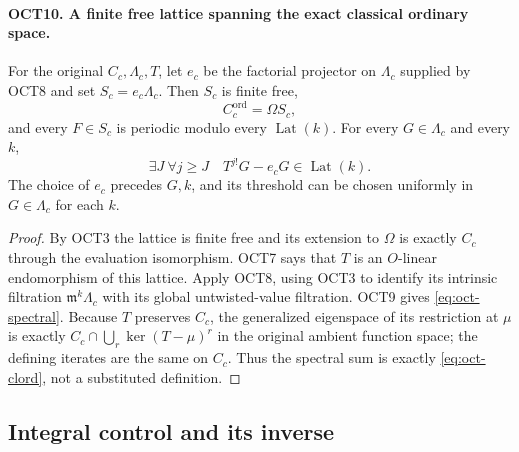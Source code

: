 \documentclass[11pt,a4paper]{article}
\numberwithin{equation}{section}
\theoremstyle{remark}\newtheorem{remark}[theorem]{Remark}
\begin{document}
\paragraph{OCT10. A finite free lattice spanning the exact classical ordinary space.}
\label{claim:OCT10}
For the original $C_c,\Lambda_c,\allowbreak{} T$, let $e_c$ be the factorial
projector on $\Lambda_c$ supplied by OCT8 and set
$S_c=e_c\Lambda_c$.  Then $S_c$ is finite free,
\begin{equation}\label{eq:oct-spectral}
                      C_c^{\mathrm{ord}}=\Omega S_c,
\end{equation}
and every $F\in S_c$ is periodic modulo every
$\operatorname{Lat}(k)$.  For every $G\in\Lambda_c$ and
every $k$,
\begin{equation}\label{eq:oct-classical-factorial}
 \exists J\ \forall j\geq J\quad
              T^{j!}G-e_cG\in\operatorname{Lat}(k).
\end{equation}
The choice of $e_c$ precedes $G,\allowbreak{} k$, and its threshold can be
chosen uniformly in $G\in\Lambda_c$ for each $k$.
\begin{proof}
By OCT3 the lattice is finite free and its extension to
$\Omega$ is exactly $C_c$ through the evaluation isomorphism.
OCT7 says that $T$ is an $O$-linear endomorphism of this
lattice.  Apply OCT8, using OCT3 to identify its intrinsic
filtration $\mathfrak m^k\Lambda_c$ with its global
untwisted-value filtration.  OCT9 gives
\eqref{eq:oct-spectral}.  Because $T$ preserves $C_c$,
the generalized eigenspace of its restriction at $\mu$ is
exactly $C_c\cap\bigcup_r\ker(T-\mu)^r$ in the original
ambient function space; the defining iterates are the same
on $C_c$.  Thus the spectral sum is exactly
\eqref{eq:oct-clord}, not a substituted definition.
\end{proof}

\subsection{Integral control and its inverse}

\end{document}
